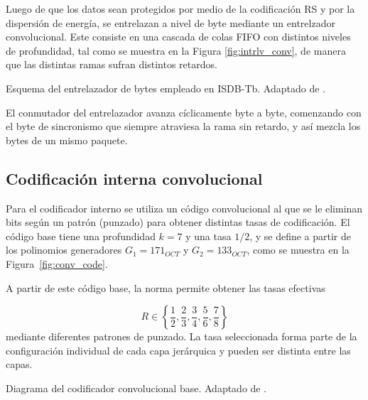 Luego de que los datos sean protegidos por medio de la codificación RS y por la dispersión de energía, se entrelazan a nivel de byte mediante un entrelzador convolucional. Este consiste en una cascada de colas FIFO con distintos niveles de profundidad, tal como se muestra en la Figura \ref{fig:intrlv_conv}, de manera que las distintas ramas sufran distintos retardos.


{Esquema del entrelazador de bytes empleado en ISDB-Tb.}
{Adaptado de \cite{isdbt}.}
{\label{fig:intrlv_conv}}


El conmutador del entrelazador avanza cíclicamente byte a byte, comenzando con el byte de sincronismo que siempre atraviesa la rama sin retardo, y así mezcla los bytes de un mismo paquete.




\subsection{Codificación interna convolucional}

Para el codificador interno se utiliza un código convolucional al que se le eliminan bits según un patrón (punzado) para obtener distintas tasas de codificación. El código base tiene una profundidad \(k=7\) y una tasa \(1/2\), y se define a partir de los polinomios generadores \(G_1 = 171_{OCT}\) y \(G_2 = 133_{OCT}\), como se muestra en la Figura~\ref{fig:conv_code}.

A partir de este código base, la norma permite obtener las tasas efectivas

\begin{equation}
R \in \left\{\frac12,\frac23,\frac34,\frac56,\frac78\right\}
\end{equation}
mediante diferentes patrones de punzado. La tasa seleccionada forma parte de la configuración individual de cada capa jerárquica y pueden ser distinta entre las capas.

{Diagrama del codificador convolucional base.}
{Adaptado de \cite{isdbt}.}
{\label{fig:conv_code}}

